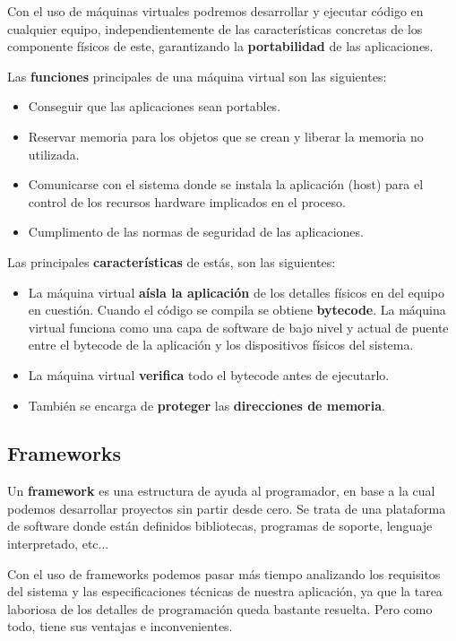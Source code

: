 Con el uso de máquinas virtuales podremos desarrollar y ejecutar código en cualquier equipo, independientemente de las características concretas de los componente físicos de este, garantizando la \textbf{portabilidad} de las aplicaciones.

Las \textbf{funciones} principales de una máquina virtual son las siguientes:

\begin{itemize}
    \item Conseguir que las aplicaciones sean portables.
    \item Reservar memoria para los objetos que se crean y liberar la memoria no utilizada.
    \item Comunicarse con el sistema donde se instala la aplicación (host) para el control de los recursos hardware implicados en el proceso.
    \item Cumplimento de las normas de seguridad de las aplicaciones.
\end{itemize}

Las principales \textbf{características} de estás, son las siguientes:

\begin{itemize}
    \item La máquina virtual \textbf{aísla la aplicación} de los detalles físicos en del equipo en cuestión. Cuando el código se compila se obtiene \textbf{bytecode}. La máquina virtual funciona como una capa de software de bajo nivel y actual de puente entre el bytecode de la aplicación y los dispositivos físicos del sistema.
    \item La máquina virtual \textbf{verifica} todo el bytecode antes de ejecutarlo.
    \item También se encarga de \textbf{proteger} las \textbf{direcciones de memoria}.
\end{itemize}

\subsection{Frameworks}
Un \textbf{framework} es una estructura de ayuda al programador, en base a la cual podemos desarrollar proyectos sin partir desde cero. Se trata de una plataforma de software donde están definidos bibliotecas, programas de soporte, lenguaje interpretado, etc...

Con el uso de frameworks podemos pasar más tiempo analizando los requisitos del sistema y las especificaciones técnicas de nuestra aplicación, ya que la tarea laboriosa de los detalles de programación queda bastante resuelta. Pero como todo, tiene sus ventajas e inconvenientes.

